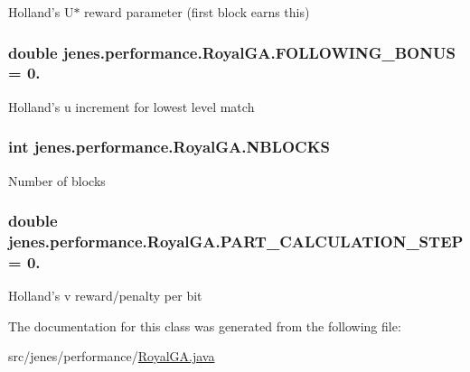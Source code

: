 Holland's U$\ast$ reward parameter (first block earns this) \hypertarget{classjenes_1_1performance_1_1_royal_g_a_a7408c7557c862b63264661fa7cf3e2a9}{
\subsubsection[{F\-O\-L\-L\-O\-W\-I\-N\-G\-\_\-\-B\-O\-N\-U\-S}]{\setlength{\rightskip}{0pt plus 5cm}double jenes.\-performance.\-Royal\-G\-A.\-F\-O\-L\-L\-O\-W\-I\-N\-G\-\_\-\-B\-O\-N\-U\-S = 0.\hspace{0.3cm}{\ttfamily [private]}}}\label{classjenes_1_1performance_1_1_royal_g_a_a7408c7557c862b63264661fa7cf3e2a9}
Holland's u increment for lowest level match \hypertarget{classjenes_1_1performance_1_1_royal_g_a_a3629231ca7912752ec359a34cb7b7c96}{
\subsubsection[{N\-B\-L\-O\-C\-K\-S}]{\setlength{\rightskip}{0pt plus 5cm}int jenes.\-performance.\-Royal\-G\-A.\-N\-B\-L\-O\-C\-K\-S\hspace{0.3cm}{\ttfamily [private]}}}\label{classjenes_1_1performance_1_1_royal_g_a_a3629231ca7912752ec359a34cb7b7c96}
Number of blocks \hypertarget{classjenes_1_1performance_1_1_royal_g_a_aef4b54dc14d35e6f66a15a1451f54b82}{
\subsubsection[{P\-A\-R\-T\-\_\-\-C\-A\-L\-C\-U\-L\-A\-T\-I\-O\-N\-\_\-\-S\-T\-E\-P}]{\setlength{\rightskip}{0pt plus 5cm}double jenes.\-performance.\-Royal\-G\-A.\-P\-A\-R\-T\-\_\-\-C\-A\-L\-C\-U\-L\-A\-T\-I\-O\-N\-\_\-\-S\-T\-E\-P = 0.\hspace{0.3cm}{\ttfamily [private]}}}\label{classjenes_1_1performance_1_1_royal_g_a_aef4b54dc14d35e6f66a15a1451f54b82}
Holland's v reward/penalty per bit 

The documentation for this class was generated from the following file\-:\begin{DoxyCompactItemize}
\item 
src/jenes/performance/\hyperlink{_royal_g_a_8java}{Royal\-G\-A.\-java}\end{DoxyCompactItemize}
